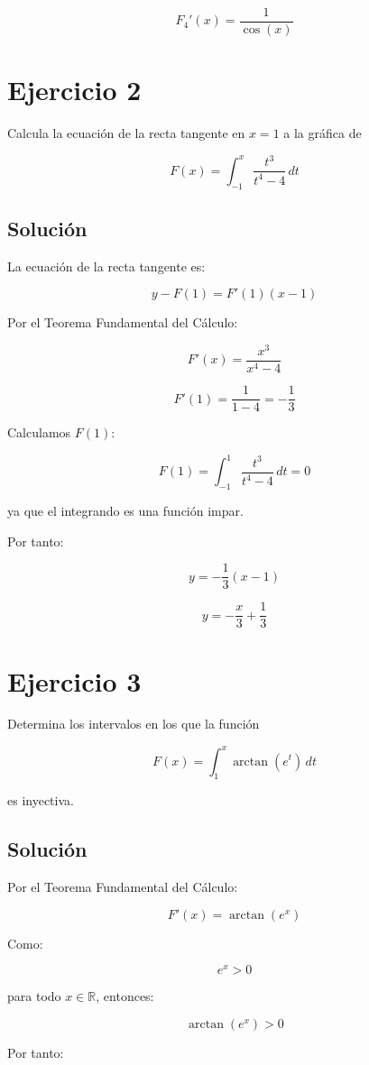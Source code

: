 \documentclass[fleqn]{article}
\begin{document}
	\[
	\boxed{F_4'(x)=\frac{1}{\cos(x)}}
	\]

\section{Ejercicio 2}
	Calcula la ecuación de la recta tangente en $x=1$ a la gráfica de

	\[
	F(x)=\int_{-1}^{x}\frac{t^3}{t^4-4}\,dt
	\]

	\subsection{Solución}

	La ecuación de la recta tangente es:

	\[
	y-F(1)=F'(1)(x-1)
	\]

	Por el Teorema Fundamental del Cálculo:

	\[
	F'(x)=\frac{x^3}{x^4-4}
	\]

	\[
	F'(1)=\frac{1}{1-4}=-\frac{1}{3}
	\]

	Calculamos $F(1)$:

	\[
	F(1)
	=
	\int_{-1}^{1}\frac{t^3}{t^4-4}\,dt
	=
	0
	\]

	ya que el integrando es una función impar.

	Por tanto:

	\[
	y
	=
	-\frac{1}{3}(x-1)
	\]

	\[
	\boxed{
	y=-\frac{x}{3}+\frac{1}{3}
	}
	\]

\section{Ejercicio 3}
	Determina los intervalos en los que la función

	\[
	F(x)=\int_1^x \arctan(e^t)\,dt
	\]

	es inyectiva.

	\subsection{Solución}

	Por el Teorema Fundamental del Cálculo:

	\[
	F'(x)=\arctan(e^x)
	\]

	Como:

	\[
	e^x>0
	\]

	para todo $x\in\mathbb{R}$, entonces:

	\[
	\arctan(e^x)>0
	\]

	Por tanto:
\end{document}
